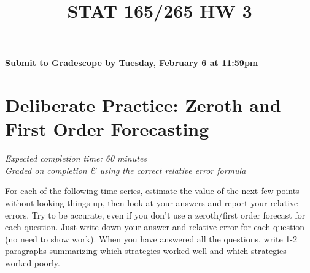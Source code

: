 \documentclass[11pt]{article}
\title{STAT 165/265 HW 3}
\begin{document}
\maketitle

\hfill \textbf{Submit to Gradescope by Tuesday, February 6 at 11:59pm}
\section*{Deliberate Practice: Zeroth and First Order Forecasting}

\emph{Expected completion time: 60 minutes} \\
\emph{Graded on completion \& using the correct relative error formula}

For each of the following time series, estimate the value of the next few points without looking things up, then look at your answers and report your relative errors. Try to be accurate, even if you don't use a zeroth/first order forecast for each question. Just write down your answer and relative error for each question (no need to show work). When you have answered all the questions, write 1-2 paragraphs summarizing which strategies worked well and which strategies worked poorly.
\end{document}
